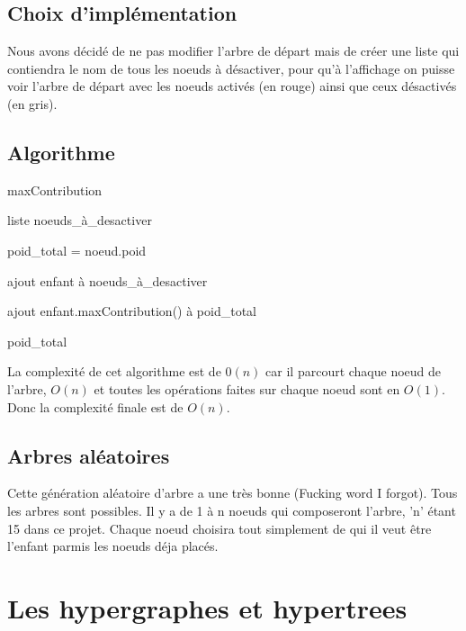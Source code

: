 \documentclass{article}
\begin{document}
	\subsection{Choix d'implémentation}

		Nous avons décidé de ne pas modifier l'arbre de départ mais de créer une liste qui contiendra le nom de tous les noeuds à désactiver, pour qu'à l'affichage on puisse voir l'arbre de départ avec les noeuds activés (en rouge) ainsi que ceux désactivés (en gris).
	
	
		\subsection{Algorithme}
		
		\begin{algorithm}[H]
		\caption{maxContribution}
		\begin{algorithmic}[1]
		\REQUIRE liste noeuds\_à\_desactiver

		\STATE poid\_total = noeud.poid
	
	
		\STATE ajout enfant à noeuds\_à\_desactiver

		\ELSE
		\STATE ajout enfant.maxContribution() à poid\_total
	
		\ENDIF	
		\ENDFOR

		\RETURN poid\_total

		\end{algorithmic}
		\end{algorithm}
	
		La complexité de cet algorithme est de $0(n)$ car il parcourt chaque noeud de l'arbre, $O(n)$ et toutes les opérations faites sur chaque noeud sont en $O(1)$. Donc la complexité finale est de $O(n)$.
		
	\subsection{Arbres aléatoires}
	Cette génération aléatoire d'arbre a une très bonne (Fucking word I forgot). Tous les arbres sont possibles. Il y a  de 1 à n noeuds qui composeront l'arbre, 'n' étant 15 dans ce projet. Chaque noeud choisira tout simplement de qui il veut être l'enfant parmis les noeuds déja placés.
	
\section{Les hypergraphes et hypertrees}
\end{document}
